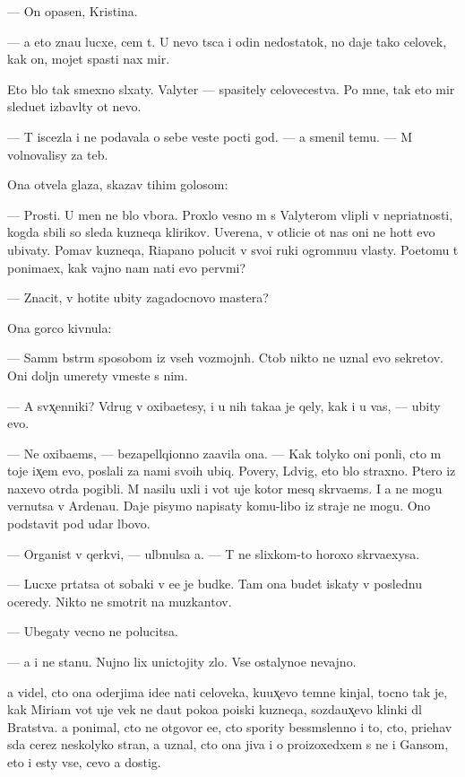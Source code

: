 \documentclass[10pt]{book}
\begin{document}
— On opasen, Kristina.

— {\Y}a eto zna{\y}u lucxe, cem t{\yi}. U nevo t{\yi}s{\ia}ca i odin nedostatok, no daje tako{\y} celovek, kak on, mojet spasti nax mir.

Eto b{\yi}lo tak smexno sl{\yi}xaty. Valyter — spasitely celovecestva. Po mne, tak eto mir sledu{\y}et izbavl{\ia}ty ot nevo.

— T{\yi} iscezla i ne podavala o sebe veste{\y} pocti god. — {\Y}a smenil temu. — M{\yi} volnovalisy za teb{\ia}.

Ona otvela glaza, skazav tihim golosom:

— Prosti. U men{\ia} ne b{\yi}lo v{\yi}bora. Proxlo{\y} vesno{\y} m{\yi} s Valyterom vlipli v nepri{\y}atnosti, kogda sbili so sleda kuzneqa klirikov. Uverena, v otlici{\y}e ot nas oni ne hot{\ia}t {\y}evo ubivaty. Po{\y}mav kuzneqa, Riapano polucit v svo{\y}i ruki ogromnu{\y}u vlasty. Poetomu t{\yi} ponima{\y}ex, kak vajno nam na{\y}ti {\y}evo perv{\yi}mi?

— Znacit, v{\yi} hotite ubity zagadocnovo mastera?

Ona gor{\ia}co kivnula:

— Sam{\yi}m b{\yi}str{\yi}m sposobom iz vseh vozmojn{\yi}h. Ctob{\yi} nikto ne uznal {\y}evo sekretov. Oni doljn{\yi} umerety vmeste s nim.

— A sv{\ia}x̨enniki? Vdrug v{\yi} oxiba{\y}etesy, i u nih taka{\y}a je qely, kak i u vas, — ubity {\y}evo.

— Ne oxiba{\y}ems{\ia}, — bezapell{\ia}qionno za{\y}avila ona. — Kak tolyko oni pon{\ia}li, cto m{\yi} toje ix̨em {\y}evo, poslali za nami svo{\y}ih ubi{\y}q. Povery, L{\iu}dvig, eto b{\yi}lo straxno. P{\ia}tero iz naxevo otr{\ia}da pogibli. M{\yi} nasilu uxli i vot uje kotor{\yi}{\y} mes{\ia}q skr{\yi}va{\y}ems{\ia}. I {\y}a ne mogu vernutsa v Ardenau. Daje pisymo napisaty komu-libo iz straje{\y} ne mogu. Ono podstavit pod udar l{\iu}bovo.

— Organist v qerkvi, — ul{\yi}bnulsa {\y}a. — T{\yi} ne slixkom-to horoxo skr{\yi}va{\y}exysa.

— Lucxe pr{\ia}tatsa ot sobaki v {\y}e{\y}e je budke. Tam ona budet iskaty v posledn{\iu}{\y}u oceredy. Nikto ne smotrit na muz{\yi}kantov.

— Ubegaty vecno ne polucitsa.

— {\Y}a i ne stanu. Nujno lix unictojity zlo. Vse ostalyno{\y}e nevajno.

{\Y}a videl, cto ona oderjima ide{\y}e{\y} na{\y}ti celoveka, ku{\y}ux̨evo temn{\yi}{\y}e kinjal{\yi}, tocno tak je, kak Miriam vot uje vek ne da{\y}ut poko{\y}a po{\y}iski kuzneqa, sozda{\y}ux̨evo klinki dl{\ia} Bratstva. {\Y}a ponimal, cto ne otgovor{\iu} {\y}e{\y}e, cto spority bessm{\yi}slenno i to, cto, pri{\y}ehav s{\iu}da cerez neskolyko stran, {\y}a uznal, cto ona jiva i o pro{\y}izoxedxem s ne{\y} i Gansom, eto i {\y}esty vse, cevo {\y}a dostig.
\end{document}
